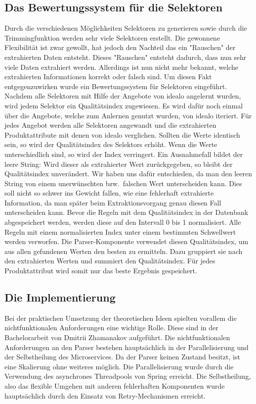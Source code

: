 \subsection{Das Bewertungssystem für die Selektoren}
\label{subsec:bewertungssystem}

Durch die verschiedenen Möglichkeiten Selektoren zu generieren sowie durch die Trimmingfunktion werden sehr viele
Selektoren erstellt.
Die gewonnene Flexibilität ist zwar gewollt, hat jedoch den Nachteil das ein "Rauschen" der extrahierten Daten entsteht.
Dieses "Rauschen" entsteht dadurch, dass nun sehr viele Daten extrahiert werden.
Allerdings ist nun nicht mehr bekannt, welche extrahierten Informationen korrekt oder falsch sind.
Um diesen Fakt entgegenzuwirken wurde ein Bewertungssystem für Selektoren eingeführt.
Nachdem alle Selektoren mit Hilfe der Angebote von idealo angelernt wurden, wird jedem Selektor ein Qualitätsindex
zugewiesen.
Es wird dafür noch einmal über die Angebote, welche zum Anlernen genutzt wurden, von idealo iteriert.
Für jedes Angebot werden alle Selektoren angewandt und die extrahierten Produktattribute mit denen von idealo
verglichen.
Sollten die Werte identisch sein, so wird der Qualitätsindex des Selektors erhöht.
Wenn die Werte unterschiedlich sind, so wird der Index verringert.
Ein Ausnahmefall bildet der leere String: Wird dieser als extrahierter Wert zurückgegeben, so bleibt der
Qualitätsindex unverändert.
Wir haben uns dafür entschieden, da man den leeren String von einem unerwünschten bzw.\  falschen Wert unterscheiden
kann.
Dies soll nicht so schwer ins Gewicht fallen, wie eine fehlerhaft extrahierte Information, da man später beim
Extraktionsvorgang genau diesen Fall unterscheiden kann.
Bevor die Regeln mit dem Qualitätsindex in der Datenbank abgespeichert werden, werden diese auf den
Intervall 0 bis 1 normalisiert.
Alle Regeln mit einem normalisierten Index unter einem bestimmten Schwellwert werden verworfen.
Die Parser-Komponente verwendet diesen Qualitätsindex, um aus allen gefundenen Werten den besten zu ermitteln.
Dazu gruppiert sie nach den extrahierten Werten und summiert den Qualitätsindex.
Für jedes Produktattribut wird somit nur das beste Ergebnis gespeichert.

\subsection{Die Implementierung}
\label{subsec:implementierung}

Bei der praktischen Umsetzung der theoretischen Ideen spielten vorallem die nichtfunktionalen Anforderungen eine
wichtige Rolle.
Diese sind in der Bachelorarbeit von Dmitrii Zhamanakov aufgeführt.
Die nichtfunktionalen Anforderungen an den Parser bestehen hauptsächlich in der Parallelisierung und der
Selbstheilung des Microservices.
Da der Parser keinen Zustand besitzt, ist eine Skalierung ohne weiteres möglich.
Die Parallelisierung wurde durch die Verwendung des asynchrones Threadpools von Spring erreicht.
Die Selbstheilung, also das flexible Umgehen mit anderen fehlerhaften Komponenten wurde hauptsächlich durch den
Einsatz von Retry-Mechanismen erreicht.

